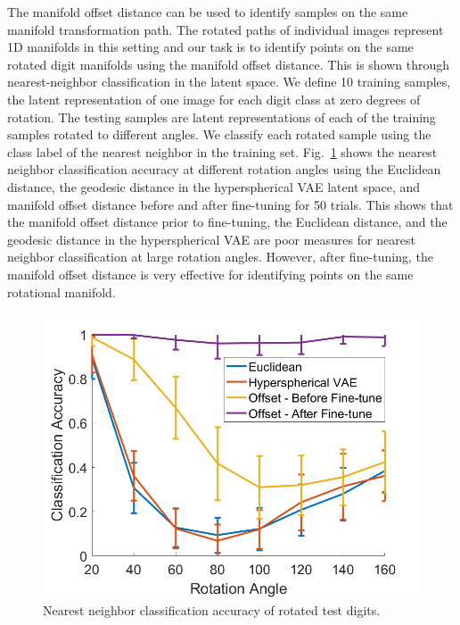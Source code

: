 \documentclass[letterpaper]{article} %
\begin{document}
The manifold offset distance can be used to identify samples on the same manifold transformation path. The rotated paths of individual images represent 1D manifolds in this setting and our task is to identify points on the same rotated digit manifolds using the manifold offset distance. This is shown through nearest-neighbor classification in the latent space. We define 10 training samples, the latent representation of one image for each digit class at zero degrees of rotation. The testing samples are latent representations of each of the training samples rotated to different angles. We classify each rotated sample using the class label of the nearest neighbor in the training set. Fig.~\ref{fig:kNNFig} shows the nearest neighbor classification accuracy at different rotation angles using the Euclidean distance, the geodesic distance in the hyperspherical VAE latent space, and manifold offset distance before and after fine-tuning for 50 trials. This shows that the manifold offset distance prior to fine-tuning, the Euclidean distance, and the geodesic distance in the hyperspherical VAE are poor measures for nearest neighbor classification at large rotation angles. However, after fine-tuning, the manifold offset distance is very effective for identifying points on the same rotational manifold.

\begin{figure}[t]
\centering

\includegraphics[width=0.8\columnwidth]{kNNAcc_hvae.png}

	\caption{\label{fig:kNNFig} Nearest neighbor classification accuracy of rotated test digits. }

\end{figure}
\end{document}
